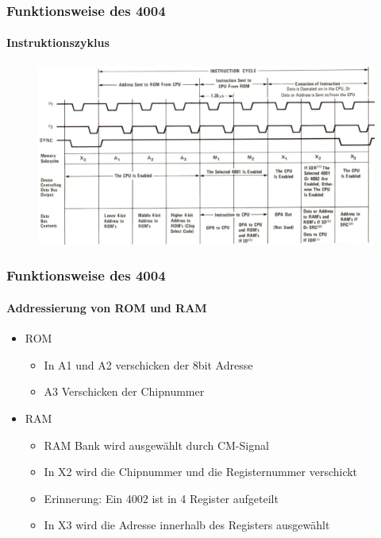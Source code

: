 \begin{frame}
	\frametitle{Funktionsweise des 4004}
	\framesubtitle{Instruktionszyklus}
	\begin{figure}[ht]
		\includegraphics[width=1\linewidth]{images/instruction_cycle.png}
	\end{figure}
\end{frame}

\begin{frame}
	\frametitle{Funktionsweise des 4004}
	\framesubtitle{Addressierung von ROM und RAM}
			\begin{itemize}
				\item ROM
				\begin{itemize}
					\item In A1 und A2 verschicken der 8bit Adresse
					\item A3 Verschicken der Chipnummer
				\end{itemize}
				\item RAM
				\begin{itemize}
					\item RAM Bank wird ausgewählt durch CM-Signal
					\item In X2 wird die Chipnummer und die Registernummer verschickt
					\item Erinnerung: Ein 4002 ist in 4 Register aufgeteilt
					\item In X3 wird die Adresse innerhalb des Registers ausgewählt
				\end{itemize}
			\end{itemize}
\end{frame}

